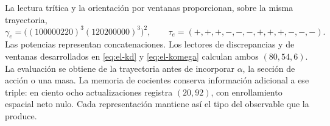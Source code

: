 La lectura trítica y la orientación por ventanas proporcionan, sobre
la misma trayectoria,
\[
 \gamma_e=\bigl((100000220)^3(120200000)^3\bigr)^2,\qquad
 \tau_e=(+,+,+,-,-,-,+,+,+,-,-,-).
\]
Las potencias representan concatenaciones. Los lectores de
discrepancias y de ventanas desarrollados en
\eqref{eq:el-kd} y \eqref{eq:el-komega} calculan ambos
\((80,54,6)\). La evaluación se obtiene de la trayectoria antes
de incorporar \(\alpha\), la sección de acción o una masa.
La memoria de cocientes conserva información adicional a ese triple:
en ciento ocho actualizaciones registra \((20,92)\), con
enrollamiento espacial neto nulo. Cada representación mantiene así el
tipo del observable que la produce.
